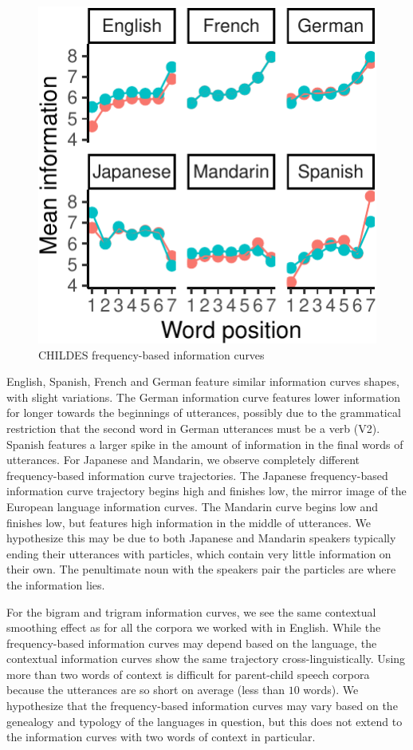 \documentclass[man,floatsintext]{apa6}
\begin{document}
\begin{figure}
\centering
\includegraphics{figs/unnamed-chunk-1-1.pdf}
\caption{\label{fig:unnamed-chunk-1}CHILDES frequency-based information curves}
\end{figure}

English, Spanish, French and German feature similar information curves shapes, with slight variations. The German information curve features lower information for longer towards the beginnings of utterances, possibly due to the grammatical restriction that the second word in German utterances must be a verb (V2). Spanish features a larger spike in the amount of information in the final words of utterances. For Japanese and Mandarin, we observe completely different frequency-based information curve trajectories. The Japanese frequency-based information curve trajectory begins high and finishes low, the mirror image of the European language information curves. The Mandarin curve begins low and finishes low, but features high information in the middle of utterances. We hypothesize this may be due to both Japanese and Mandarin speakers typically ending their utterances with particles, which contain very little information on their own. The penultimate noun with the speakers pair the particles are where the information lies.

For the bigram and trigram information curves, we see the same contextual smoothing effect as for all the corpora we worked with in English. While the frequency-based information curves may depend based on the language, the contextual information curves show the same trajectory cross-linguistically. Using more than two words of context is difficult for parent-child speech corpora because the utterances are so short on average (less than \(10\) words). We hypothesize that the frequency-based information curves may vary based on the genealogy and typology of the languages in question, but this does not extend to the information curves with two words of context in particular.
\end{document}
